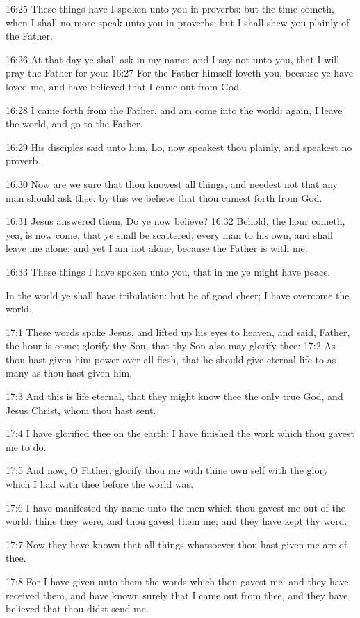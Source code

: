 16:25 These things have I spoken unto you in proverbs: but the time cometh, when I shall no more speak unto you in proverbs, but I shall shew you plainly of the Father.

16:26 At that day ye shall ask in my name: and I say not unto you, that I will pray the Father for you: 16:27 For the Father himself loveth you, because ye have loved me, and have believed that I came out from God.

16:28 I came forth from the Father, and am come into the world: again, I leave the world, and go to the Father.

16:29 His disciples said unto him, Lo, now speakest thou plainly, and speakest no proverb.

16:30 Now are we sure that thou knowest all things, and needest not that any man should ask thee: by this we believe that thou camest forth from God.

16:31 Jesus answered them, Do ye now believe?  16:32 Behold, the hour cometh, yea, is now come, that ye shall be scattered, every man to his own, and shall leave me alone: and yet I am not alone, because the Father is with me.

16:33 These things I have spoken unto you, that in me ye might have peace.

In the world ye shall have tribulation: but be of good cheer; I have overcome the world.

17:1 These words spake Jesus, and lifted up his eyes to heaven, and said, Father, the hour is come; glorify thy Son, that thy Son also may glorify thee: 17:2 As thou hast given him power over all flesh, that he should give eternal life to as many as thou hast given him.

17:3 And this is life eternal, that they might know thee the only true God, and Jesus Christ, whom thou hast sent.

17:4 I have glorified thee on the earth: I have finished the work which thou gavest me to do.

17:5 And now, O Father, glorify thou me with thine own self with the glory which I had with thee before the world was.

17:6 I have manifested thy name unto the men which thou gavest me out of the world: thine they were, and thou gavest them me; and they have kept thy word.

17:7 Now they have known that all things whatsoever thou hast given me are of thee.

17:8 For I have given unto them the words which thou gavest me; and they have received them, and have known surely that I came out from thee, and they have believed that thou didst send me.

